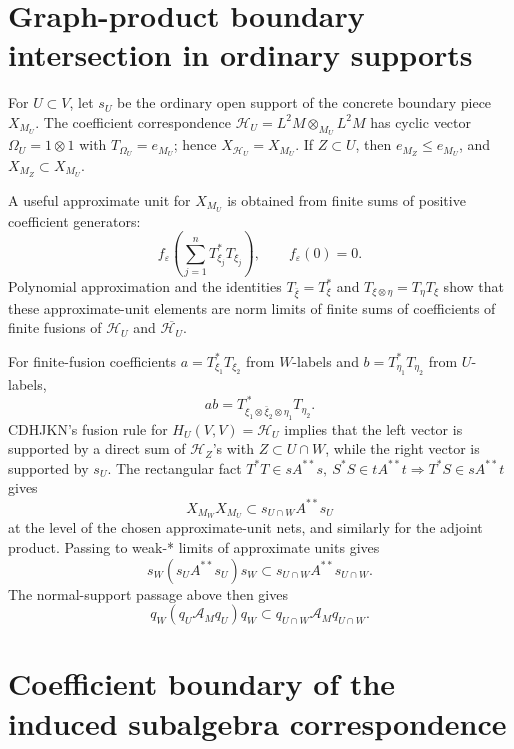\documentclass{article}
\begin{document}
\section*{Graph-product boundary intersection in ordinary supports}

For \(U\subset V\), let \(s_U\) be the ordinary open support of the concrete
boundary piece \(X_{M_U}\).  The coefficient correspondence
\(\mathcal H_U=L^2M\otimes_{M_U}L^2M\) has cyclic vector
\(\Omega_U=1\otimes1\) with \(T_{\Omega_U}=e_{M_U}\); hence
\(X_{\mathcal H_U}=X_{M_U}\).  If \(Z\subset U\), then
\(e_{M_Z}\le e_{M_U}\), and \(X_{M_Z}\subset X_{M_U}\).

A useful approximate unit for \(X_{M_U}\) is obtained from finite sums of
positive coefficient generators:
\[
        f_\varepsilon\left(\sum_{j=1}^n T_{\xi_j}^*T_{\xi_j}\right),
        \qquad f_\varepsilon(0)=0 .
\]
Polynomial approximation and the identities \(T_{\bar\xi}=T_\xi^*\) and
\(T_{\xi\otimes\eta}=T_\eta T_\xi\) show that these approximate-unit elements
are norm limits of finite sums of coefficients of finite fusions of
\(\mathcal H_U\) and \(\overline{\mathcal H_U}\).

For finite-fusion coefficients \(a=T_{\xi_1}^*T_{\xi_2}\) from \(W\)-labels and
\(b=T_{\eta_1}^*T_{\eta_2}\) from \(U\)-labels,
\[
        ab=T_{\xi_1\otimes\bar\xi_2\otimes\eta_1}^{\,*}T_{\eta_2}.
\]
CDHJKN's fusion rule for \(H_U(V,V)=\mathcal H_U\) implies that the left vector
is supported by a direct sum of \(\mathcal H_Z\)'s with
\(Z\subset U\cap W\), while the right vector is supported by \(s_U\).  The
rectangular fact \(T^*T\in sA^{**}s,\ S^*S\in tA^{**}t\Rightarrow
T^*S\in sA^{**}t\) gives
\[
        X_{M_W}X_{M_U}\subset s_{U\cap W}A^{**}s_U
\]
at the level of the chosen approximate-unit nets, and similarly for the
adjoint product.  Passing to weak-* limits of approximate units gives
\[
        s_W(s_UA^{**}s_U)s_W\subset s_{U\cap W}A^{**}s_{U\cap W}.
\]
The normal-support passage above then gives
\[
        q_W(q_U\mathcal A_Mq_U)q_W
        \subset q_{U\cap W}\mathcal A_Mq_{U\cap W}.
\]



\section*{Coefficient boundary of the induced subalgebra correspondence}
\end{document}
